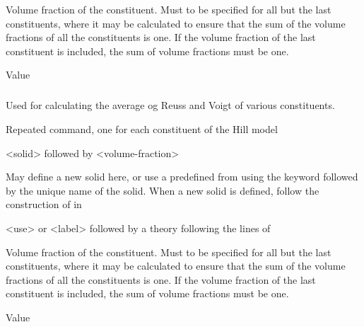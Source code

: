 {
 \slist
   \item \Description Volume fraction of the constituent. Must to be specified for all but the last constituents, where it may be calculated to ensure that the sum of the volume fractions of all the constituents is one. If the volume fraction of the last constituent is included, the sum of volume fractions must be one. 
   \item \Argument Value
   \item \Default
 \elist

\subparagraph{}
 \slist
   \item \Description Used for calculating the average og Reuss and Voigt of various constituents.
   \item \Argument
   \item \Default 
 \elist

 \slist
   \item \Description Repeated command, one for each constituent of the Hill model
   \item \Argument <solid> followed by <volume-fraction>
   \item \Default
 \elist

 \slist
   \item \Description May define a new solid here, or use a predefined  from  using the keyword  followed by the unique name of the solid. When a new solid is defined, follow the construction of  in 
   \item \Argument <use> or <label> followed by a theory following the lines of 
   \item \Default
 \elist

 \slist
   \item \Description Volume fraction of the constituent. Must to be specified for all but the last constituents, where it may be calculated to ensure that the sum of the volume fractions of all the constituents is one. If the volume fraction of the last constituent is included, the sum of volume fractions must be one. 
   \item \Argument Value
   \item \Default
 \elist

}
